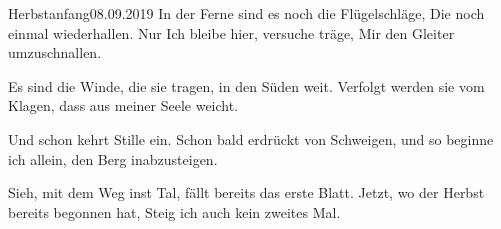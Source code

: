 \begin{poem}{Herbstanfang}{08.09.2019}
In der Ferne sind es noch die Flügelschläge,
Die noch einmal wiederhallen.
Nur Ich bleibe hier, versuche träge,
Mir den Gleiter umzuschnallen.

Es sind die Winde, die sie tragen,
in den Süden weit.
Verfolgt werden sie vom Klagen,
dass aus meiner Seele weicht.

Und schon kehrt Stille ein.
Schon bald erdrückt von Schweigen,
und so beginne ich allein,
den Berg inabzusteigen.

Sieh, mit dem Weg inst Tal,
fällt bereits das erste Blatt.
Jetzt, wo der Herbst bereits begonnen hat,
Steig ich auch kein zweites Mal.
\end{poem}